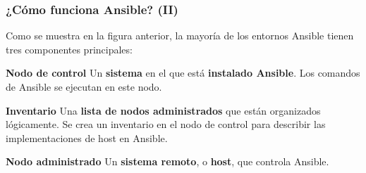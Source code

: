 \documentclass[
	11pt, %
]{beamer}
\begin{document}

\begin{frame}
	\frametitle{¿Cómo funciona Ansible? (II)}

	Como se muestra en la figura anterior, la mayoría de los entornos Ansible tienen tres componentes principales:

	\begin{block}{\textbf{Nodo de control}}
		Un \textbf{sistema} en el que está \textbf{instalado Ansible}. Los comandos de Ansible se ejecutan en este nodo.
	\end{block}

	\begin{exampleblock}{\textbf{Inventario}}
		Una \textbf{lista de nodos administrados} que están organizados lógicamente. Se crea un inventario en el nodo de control para describir las implementaciones de host en Ansible.
	\end{exampleblock}

	\begin{alertblock}{\textbf{Nodo administrado}}
		Un \textbf{sistema remoto}, o \textbf{host}, que controla Ansible.
	\end{alertblock}

\end{frame}

\end{document}
